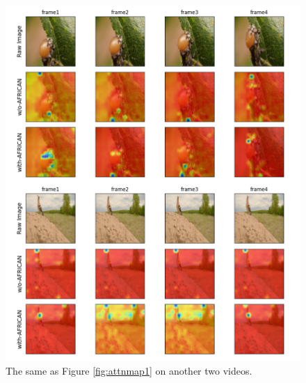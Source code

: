 \begin{figure}[ht]
    \centering
    \includegraphics[width=1.0\textwidth]{assets/charts/4_5_AttentionMaps_2}
    \caption[Attention Map 2 (Good examples)]{The same as Figure \ref{fig:attnmap1} on another two videos.}
    \label{fig:attnmap2}
\end{figure}

